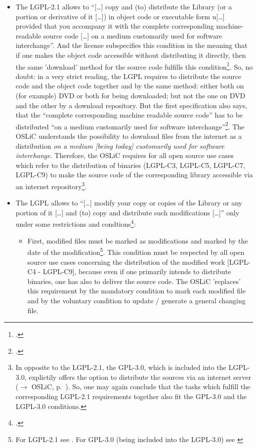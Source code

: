 \begin{itemize}
  \item The LGPL-2.1 allows to \enquote{[\ldots] copy and (to) distribute the
  Library (or a portion or derivative of it [\ldots]) in object code or
  executable form u[\ldots] provided that you accompany it with the complete
  corresponding machine-readable source code [\ldots] on a medium customarily
  used for software interchange}. And the license subspecifies this condition in
  the meaning that if one makes the object code accessible without distributing
  it directly, then the same 'download' method for the source code fulfills this
  condition\footcite[cf.][\nopage wp.\ §4]{Lgpl21OsiLicense1999a}. So, no doubt:
  in a very strict reading, the LGPL requires to distribute the source code and
  the object code together and by the same method: either both on (for example)
  DVD or both for being downloaded; but not the one on DVD and the other by a
  download repository. But the first specification also says, that the
  \enquote{complete corresponding machine readable source code} has to be
  distributed \enquote{on a medium customarily used for software
  interchange}\footcite[cf.][\nopage wp.\ §4]{Lgpl21OsiLicense1999a}. The OSLiC
  understands the possibility to download files from the internet as a
  distribution \emph{on a medium [being today] customarily used for software
  interchange}. Therefore, the OSLiC requires for all open source use cases
  which refer to the distribution of binaries (LGPL-C3, LGPL-C5, LGPL-C7, LGPL-C9)
  to make the source code of the corresponding library accessible via an
  internet repository\footnote{In opposite to the LGPL-2.1, the GPL-3.0, which
  is included into the LGPL-3.0, explictily offers the option to distribute the
  sources via an internet server ($\rightarrow$ OSLiC, p.\
  \pageref{Gpl3CondCopyleft}). So, one may again conclude that the tasks
  which fulfill the corresponding LGPL-2.1 requirements together also fit the
  GPL-3.0 and the LGPL-3.0 conditions.}.
  
  \item The LGPL allows to \enquote{[\ldots] modify your copy or copies of
  the Library or any portion of it [\ldots] and (to) copy and distribute such
  modifications [\ldots]} only under some restrictions and
  condtions\footcite[cf.][\nopage wp.\ §2]{Lgpl21OsiLicense1999a}:
  \begin{itemize}
    \item First, modified files must be marked as modifications and marked by
    the date of the modification\footnote{For LGPL-2.1 see \cite[cf.][\nopage
    wp.\ §2]{Lgpl21OsiLicense1999a}. For GPL-3.0 (being included into the
    LGPL-3.0) see \cite[cf.][\nopage wp.\ §5]{Gpl30OsiLicense2007a}}. This
    condition must be respected by all open source use cases concerning the
    distribution of the modified work [LGPL-C4 - LGPL-C9], because even if one
    primarily intends to distribute binaries, one has also to deliver the source
    code. The OSLiC 'replaces' this requirement by the mandatory condition to
    mark each modified file and by the voluntary condition to update / generate
    a general changing file.
    

\end{itemize}
\end{itemize}
